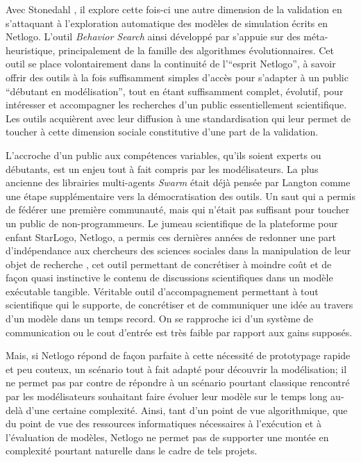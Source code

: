 Avec Stonedahl \autocites{Stonedahl2011, Stonedahl2011b, Stonedahl2010}, il explore cette fois-ci une autre dimension de la validation en s'attaquant à l'exploration automatique des modèles de simulation écrits en Netlogo. L'outil \textit{Behavior Search} ainsi développé par \textcite{Stonedahl2011a} s'appuie sur des méta-heuristique, principalement de la famille des algorithmes évolutionnaires. Cet outil se place volontairement dans la continuité de l'\enquote{esprit Netlogo}, à savoir offrir des outils à la fois suffisamment simples d'accès pour s'adapter à un public \enquote{débutant en modélisation}, tout en étant suffisamment complet, évolutif, pour intéresser et accompagner les recherches d'un public essentiellement scientifique. Les outils acquièrent avec leur diffusion à une standardisation qui leur permet de toucher à cette dimension sociale constitutive d'une part de la validation.

L'accroche d'un public aux compétences variables, qu'ils soient experts ou débutants, est un enjeu tout à fait compris par les modélisateurs. La plus ancienne des librairies multi-agents \textit{Swarm} était déjà pensée par Langton comme une étape supplémentaire vers la démocratisation des outils. Un saut qui a permis de fédérer une première communauté, mais qui n'était pas suffisant pour toucher un public de non-programmeurs. Le jumeau scientifique de la plateforme pour enfant StarLogo, Netlogo, a permis ces dernières années de redonner une part d'indépendance aux chercheurs des sciences sociales dans la manipulation de leur objet de recherche \autocite{Banos2013}, cet outil permettant de concrétiser à moindre coût et de façon quasi instinctive le contenu de discussions scientifiques dans un modèle exécutable tangible. Véritable outil d'accompagnement permettant à tout scientifique qui le supporte, de concrétiser et de communiquer une idée au travers d'un modèle dans un temps record. On se rapproche ici d'un système de communication ou le cout d'entrée est très faible par rapport aux gains supposés. 

Mais, si Netlogo répond de façon parfaite à cette nécessité de prototypage rapide et peu couteux, un scénario tout à fait adapté pour découvrir la modélisation; il ne permet pas par contre de répondre à un scénario pourtant classique rencontré par les modélisateurs souhaitant faire évoluer leur modèle sur le temps long au-delà d'une certaine complexité. Ainsi, tant d'un point de vue algorithmique, que du point de vue des ressources informatiques nécessaires à l'exécution et à l'évaluation de modèles, Netlogo ne permet pas de supporter une montée en complexité pourtant naturelle dans le cadre de tels projets. 

